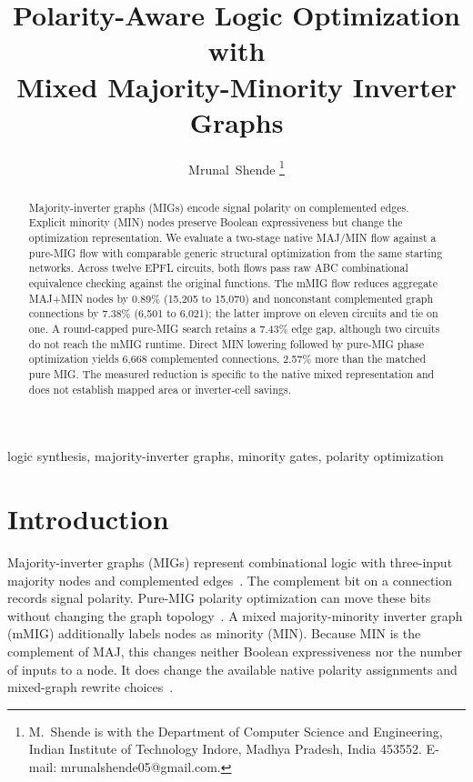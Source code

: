 \documentclass[10pt,journal]{IEEEtran}
\begin{document}
\title{Polarity-Aware Logic Optimization with\\Mixed Majority-Minority Inverter Graphs}
\author{Mrunal~Shende%
\thanks{M.~Shende is with the Department of Computer Science and Engineering,
Indian Institute of Technology Indore, Madhya Pradesh, India 453552.
E-mail: mrunalshende05@gmail.com.}}
\maketitle

\begin{abstract}
Majority-inverter graphs (MIGs) encode signal polarity on complemented edges.
Explicit minority (MIN) nodes preserve Boolean expressiveness but change the
optimization representation. We evaluate a two-stage native MAJ/MIN flow
against a pure-MIG flow with comparable generic structural optimization from
the same starting networks. Across twelve EPFL circuits, both flows pass raw
ABC combinational equivalence checking against the original functions. The
mMIG flow reduces aggregate MAJ+MIN nodes by 0.89\% (15,205 to 15,070) and
nonconstant complemented graph connections by 7.38\% (6,501 to 6,021); the
latter improve on eleven circuits and tie on one. A round-capped pure-MIG
search retains a 7.43\% edge gap, although two circuits do not reach the mMIG
runtime. Direct MIN lowering followed by pure-MIG phase optimization yields
6,668 complemented connections, 2.57\% more than the matched pure MIG. The
measured reduction is specific to the native mixed representation and does
not establish mapped area or inverter-cell savings.
\end{abstract}
\begin{IEEEkeywords}
logic synthesis, majority-inverter graphs, minority gates, polarity optimization
\end{IEEEkeywords}
\IEEEpeerreviewmaketitle

\section{Introduction}
\label{sec:intro}
Majority-inverter graphs (MIGs) represent combinational logic with
three-input majority nodes and complemented edges~\cite{amaru2016mig}.
The complement bit on a connection records signal polarity. Pure-MIG
polarity optimization can move these bits without changing the graph
topology~\cite{testa2016inv}. A mixed majority-minority inverter graph
(mMIG) additionally labels nodes as minority (MIN). Because MIN is the
complement of MAJ, this changes neither Boolean expressiveness nor the
number of inputs to a node. It does change the available native polarity
assignments and mixed-graph rewrite choices~\cite{aalam2021mmig}.
\end{document}
